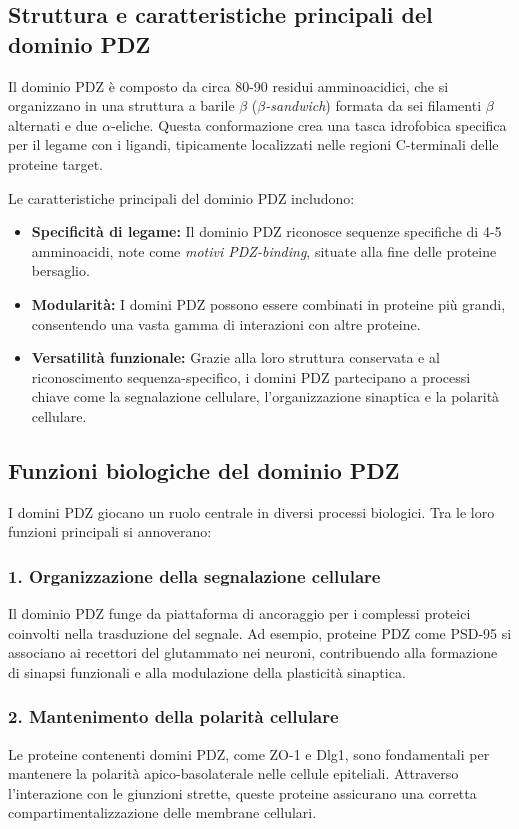 \documentclass[Lau,binding=0.6cm,oneside,noexaminfo]{sapthesis}
\begin{document}
\subsection*{Struttura e caratteristiche principali del dominio PDZ}

Il dominio PDZ è composto da circa 80-90 residui amminoacidici, che si organizzano in una struttura a barile $\beta$ (\emph{$\beta$-sandwich}) formata da sei filamenti $\beta$ alternati e due $\alpha$-eliche. Questa conformazione crea una tasca idrofobica specifica per il legame con i ligandi, tipicamente localizzati nelle regioni C-terminali delle proteine target.

Le caratteristiche principali del dominio PDZ includono:
\begin{itemize}
    \item \textbf{Specificità di legame:} Il dominio PDZ riconosce sequenze specifiche di 4-5 amminoacidi, note come \emph{motivi PDZ-binding}, situate alla fine delle proteine bersaglio.
    \item \textbf{Modularità:} I domini PDZ possono essere combinati in proteine più grandi, consentendo una vasta gamma di interazioni con altre proteine.
    \item \textbf{Versatilità funzionale:} Grazie alla loro struttura conservata e al riconoscimento sequenza-specifico, i domini PDZ partecipano a processi chiave come la segnalazione cellulare, l’organizzazione sinaptica e la polarità cellulare.
\end{itemize}

\subsection*{Funzioni biologiche del dominio PDZ}

I domini PDZ giocano un ruolo centrale in diversi processi biologici. Tra le loro funzioni principali si annoverano:

\subsubsection*{1. Organizzazione della segnalazione cellulare}
Il dominio PDZ funge da piattaforma di ancoraggio per i complessi proteici coinvolti nella trasduzione del segnale. Ad esempio, proteine PDZ come PSD-95 si associano ai recettori del glutammato nei neuroni, contribuendo alla formazione di sinapsi funzionali e alla modulazione della plasticità sinaptica.

\subsubsection*{2. Mantenimento della polarità cellulare}
Le proteine contenenti domini PDZ, come ZO-1 e Dlg1, sono fondamentali per mantenere la polarità apico-basolaterale nelle cellule epiteliali. Attraverso l’interazione con le giunzioni strette, queste proteine assicurano una corretta compartimentalizzazione delle membrane cellulari.
\end{document}
